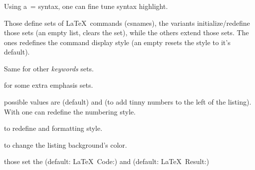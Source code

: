 \documentclass[dctools,english]{ufrgscca}
\begin{document}
\subsubsection{}
Using a \,= syntax, one can fine tune  syntax highlight.
\begin{Args}
\begin{Syntax} %
\end{Syntax}Those define sets of \LaTeX~commands (csnames), the  variants initialize/redefine those sets (an empty list, clears the set), while the others extend those sets. The  ones redefines the command display style (an empty  resets the style to it's default).\\

\begin{Syntax}	%
\end{Syntax}
Same for other \emph{keywords} sets.\\

\begin{Syntax}	%
\end{Syntax}
for some extra emphasis sets.\\

\begin{Syntax} %
\end{Syntax}
 possible values are  (default) and  (to add tinny numbers to the left of the listing). With  one can redefine the numbering style.\\

\begin{Syntax} %
\end{Syntax}
to redefine  and  formatting style.\\

\begin{Syntax} %
\end{Syntax}
to change the listing background's color.\\

\begin{Syntax} %
\end{Syntax}
those set the  (default: \LaTeX~Code:) and  (default: \LaTeX~Result:)
\end{Args}
\end{document}
